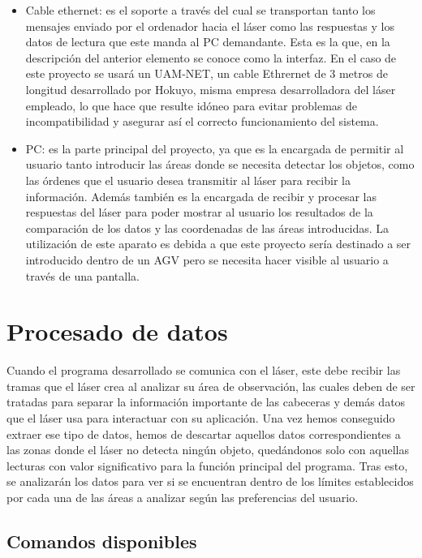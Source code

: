 \begin{itemize}
    \item Cable ethernet: es el soporte a través del cual se transportan tanto los mensajes enviado por el ordenador hacia el láser como las respuestas y los datos de lectura que este manda al PC demandante. Esta es la que, en la descripción del anterior elemento se conoce como la interfaz. En el caso de este proyecto se usará un UAM-NET, un cable Ethrernet de 3 metros de longitud desarrollado por Hokuyo, misma empresa desarrolladora del láser empleado, lo que hace que resulte idóneo para evitar problemas de incompatibilidad y asegurar así el correcto funcionamiento del sistema.
    \item PC: es la parte principal del proyecto, ya que es la encargada de permitir al usuario tanto introducir las áreas donde se necesita detectar los objetos, como las órdenes que el usuario desea transmitir al láser para recibir la información. Además también es la encargada de recibir y procesar las respuestas del láser para poder mostrar al usuario los resultados de la comparación de los datos y las coordenadas de las áreas introducidas. La utilización de este aparato es debida a que este proyecto sería destinado a ser introducido dentro de un AGV pero se necesita hacer visible al usuario a través de una pantalla.\\ 
\end{itemize}

\section{Procesado de datos}

Cuando el programa desarrollado se comunica con el láser, este debe recibir las tramas que el láser crea al analizar su área de observación, las cuales deben de ser tratadas para separar la información importante de las cabeceras y demás datos que el láser usa para interactuar con su aplicación. Una vez hemos conseguido extraer ese tipo de datos, hemos de descartar aquellos datos correspondientes a las zonas donde el láser no detecta ningún objeto, quedándonos solo con aquellas lecturas con valor significativo para la función principal del programa. Tras esto, se analizarán los datos para ver si se encuentran dentro de los límites establecidos por cada una de las áreas a analizar según las preferencias del usuario.\\

\subsection{Comandos disponibles}

